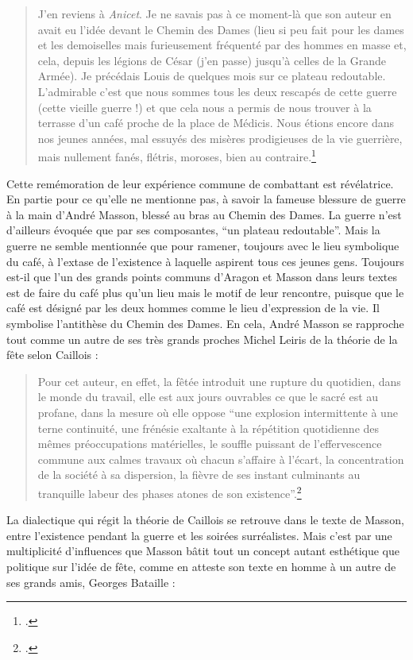 \begin{quote}J’en reviens à \emph{Anicet}. Je ne savais pas à ce moment-là que son auteur en avait eu l’idée devant le Chemin des Dames (lieu si peu fait pour les dames et les demoiselles mais furieusement fréquenté par des hommes en masse et, cela, depuis les légions de César (j’en passe) jusqu’à celles de la Grande Armée). Je précédais Louis de quelques mois sur ce plateau redoutable. L’admirable c’est que nous sommes tous les deux rescapés de cette guerre (cette vieille guerre !) et que cela nous a permis de nous trouver à la terrasse d’un café proche de la place de Médicis. Nous étions encore dans nos jeunes années, mal essuyés des misères prodigieuses de la vie guerrière, mais nullement fanés, flétris, moroses, bien au contraire.\footcite[p85]{rebelle}\end{quote}

	Cette remémoration de leur expérience commune de combattant est révélatrice. En partie pour ce qu’elle ne mentionne pas, à savoir la fameuse blessure de guerre à la main d’André Masson, blessé au bras au Chemin des Dames. La guerre n’est d’ailleurs évoquée que par ses composantes, \enquote{un plateau redoutable}. Mais la guerre ne semble mentionnée que pour ramener, toujours avec le lieu symbolique du café, à l’extase de l’existence à laquelle aspirent tous ces jeunes gens. Toujours est-il que l’un des grands points communs d’Aragon et Masson dans leurs textes est de faire du café plus qu’un lieu mais le motif de leur rencontre, puisque que le café est désigné par les deux hommes comme le lieu d’expression de la vie. Il symbolise l’antithèse du Chemin des Dames. En cela, André Masson se rapproche tout comme un autre de ses très grands proches Michel Leiris de la théorie de la fête selon Caillois :

 \begin{quote}Pour cet auteur, en effet, la fêtée introduit une rupture du quotidien, dans le monde du travail, elle est aux jours ouvrables ce que le sacré est au profane, dans la mesure où elle oppose \enquote{une explosion intermittente à une terne continuité, une frénésie exaltante à la répétition quotidienne des mêmes préoccupations matérielles, le souffle puissant de l’effervescence commune aux calmes travaux où chacun s’affaire à l’écart, la concentration de la société à sa dispersion, la fièvre de ses instant culminants au tranquille labeur des phases atones de son existence}.\footcite[]{poitryguy}\end{quote}

	La dialectique qui régit la théorie de Caillois se retrouve dans le texte de  Masson, entre l’existence pendant la guerre et les soirées surréalistes. Mais c’est par une multiplicité d’influences que Masson bâtit tout un concept autant esthétique que politique sur l’idée de fête, comme en atteste   son texte en homme à un autre de ses grands amis, Georges Bataille :
	
